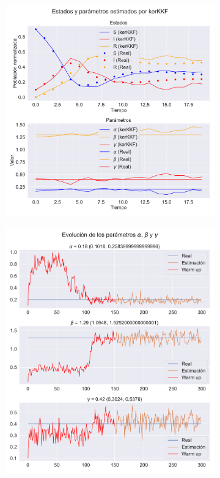 \begin{figure}[h!]
    \centering
    \begin{subfigure}[b]{0.49\textwidth}
         \centering
         \includegraphics[height=0.9\linewidth]{img/content/chapter4/nonlinear_filters_sir_rec_params.pdf}
         \caption{}
         \label{fig:nonlinear_filters_sir_rec_params}
    \end{subfigure}
    \begin{subfigure}[b]{0.49\textwidth}
         \centering \includegraphics[height=0.9\linewidth]{img/content/chapter4/nonlinear_filters_sir_rec_params_evolution.pdf}

\end{subfigure}
\end{figure}
